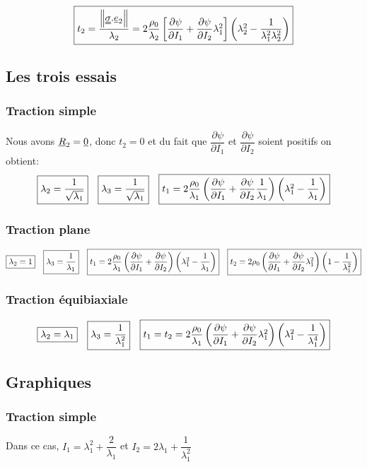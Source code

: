 \documentclass[a4paper,11pt]{article}
\begin{document}
$$ \fbox{$t_2=\dfrac{\left\|\uuline{\sigma}.\uline{e}_2\right\|}{\lambda_2}= 2\dfrac{\rho_0}{\lambda_2}\left[\dfrac{\partial \psi}{\partial I_1}+\dfrac{\partial \psi}{\partial I_2}\lambda_1^2\right]\left(\lambda_2^2-\dfrac{1}{\lambda_1^2\lambda_2^2} \right)$}
$$

\subsection{Les trois essais}
\subsubsection{Traction simple} Nous avons $\uline{R}_2=\uline{0}$, donc $t_2=0$ et du fait que $\dfrac{\partial \psi}{\partial I_1}$ et $\dfrac{\partial \psi}{\partial I_2}$ soient positifs on obtient: $$\fbox{$\lambda_2=\dfrac{1}{\sqrt{\lambda_1}}$} \quad \fbox{$\lambda_3=\dfrac{1}{\sqrt{\lambda_1}}$} \quad \fbox{$t_1=2\dfrac{\rho_0}{\lambda_1}\left(\dfrac{\partial \psi}{\partial I_1}+\dfrac{\partial \psi}{\partial I_2}\dfrac{1}{\lambda_1} \right)\left(\lambda_1^2-\dfrac{1}{\lambda_1}\right) $}$$

\subsubsection{Traction plane} $$\fbox{$\lambda_2=1$}\quad \fbox{$ \lambda_3=\dfrac{1}{\lambda_1}$}\quad\fbox{$t_1=2\dfrac{\rho_0}{\lambda_1}\left(\dfrac{\partial \psi}{\partial I_1}+\dfrac{\partial \psi}{\partial I_2} \right)\left(\lambda_1^2-\dfrac{1}{\lambda_1}\right)$}\quad\fbox{$t_2=2\rho_0\left(\dfrac{\partial \psi}{\partial I_1}+\dfrac{\partial \psi}{\partial I_2}\lambda_1^2 \right)\left(1-\dfrac{1}{\lambda_1^2}\right)$}$$

\subsubsection{Traction équibiaxiale}$$\fbox{$\lambda_2=\lambda_1$}\quad \fbox{$ \lambda_3=\dfrac{1}{\lambda_1^2}$}\quad\fbox{$t_1=t_2=2\dfrac{\rho_0}{\lambda_1}\left(\dfrac{\partial \psi}{\partial I_1}+\dfrac{\partial \psi}{\partial I_2}\lambda_1^2 \right)\left(\lambda_1^2-\dfrac{1}{\lambda_1^4}\right)$}$$

\subsection{Graphiques}
\subsubsection{Traction simple}
Dans ce cas, $I_1=\lambda_1^2+\dfrac{2}{\lambda_1}$ et $I_2=2\lambda_1+\dfrac{1}{\lambda_1^2}$
\end{document}
